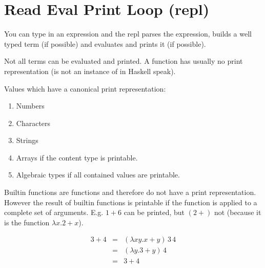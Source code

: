 \section{Read Eval Print Loop (repl)}

You can type in an expression and the repl parses the expression, builds a
well typed term (if possible) and evaluates and prints it (if possible).

Not all terms can be evaluated and printed. A function has usually no print
representation (is not an instance of  in Haskell speak).

Values which have a canonical print representation:
\begin{enumerate}

\item Numbers
\item Characters
\item Strings
\item Arrays if the content type is printable.
\item Algebraic types if all contained values are printable.
\end{enumerate}


Builtin functions are functions and therefore do not have a print
representation. However the result of builtin functions is printable if the
function is applied to a complete set of arguments. E.g. $1 + 6$ can be
printed, but $(2+)$ not (because it is the function $\lambda x. 2 + x$).

$$
%
\begin{array}{lll}
  3 + 4 &=&  (\lambda x y. x + y)\, 3 \,4
  \\
        &=& (\lambda y. 3 + y) \,4
  \\
        &=& 3 + 4
\end{array}
$$



